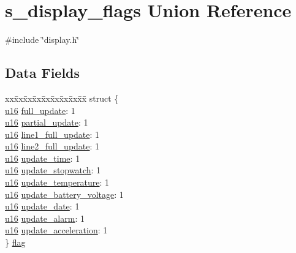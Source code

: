 \hypertarget{unions__display__flags}{\section{s\-\_\-display\-\_\-flags \-Union \-Reference}
\label{unions__display__flags}
}


{\ttfamily \#include \char`\"{}display.\-h\char`\"{}}

\subsection*{\-Data \-Fields}
\begin{DoxyCompactItemize}
\item 
\begin{tabbing}
xx\=xx\=xx\=xx\=xx\=xx\=xx\=xx\=xx\=\kill
struct \{\\
\>\hyperlink{main__ED__BM_8c_a9e6c91d77e24643b888dbd1a1a590054}{u16} \hyperlink{unions__display__flags_a71c4800011ffd6d7d66b954a94918dc0}{full\_update}: 1\\
\>\hyperlink{main__ED__BM_8c_a9e6c91d77e24643b888dbd1a1a590054}{u16} \hyperlink{unions__display__flags_a6c2c3a5d3e6b1ceeab56b3eeb805437e}{partial\_update}: 1\\
\>\hyperlink{main__ED__BM_8c_a9e6c91d77e24643b888dbd1a1a590054}{u16} \hyperlink{unions__display__flags_a2ddb9a4e7e4a70b66ff9bed6a334dc91}{line1\_full\_update}: 1\\
\>\hyperlink{main__ED__BM_8c_a9e6c91d77e24643b888dbd1a1a590054}{u16} \hyperlink{unions__display__flags_aab3b308f6c79766961f162d28a2b519f}{line2\_full\_update}: 1\\
\>\hyperlink{main__ED__BM_8c_a9e6c91d77e24643b888dbd1a1a590054}{u16} \hyperlink{unions__display__flags_a0fe35dbb92aa1da6230872d35273a99b}{update\_time}: 1\\
\>\hyperlink{main__ED__BM_8c_a9e6c91d77e24643b888dbd1a1a590054}{u16} \hyperlink{unions__display__flags_aaccf7632270071f4a6115d6934c49fa1}{update\_stopwatch}: 1\\
\>\hyperlink{main__ED__BM_8c_a9e6c91d77e24643b888dbd1a1a590054}{u16} \hyperlink{unions__display__flags_a49b58805245fc6fb2a9dd89ab9a41ef4}{update\_temperature}: 1\\
\>\hyperlink{main__ED__BM_8c_a9e6c91d77e24643b888dbd1a1a590054}{u16} \hyperlink{unions__display__flags_a1d0730fd24039050c16061de15b08b57}{update\_battery\_voltage}: 1\\
\>\hyperlink{main__ED__BM_8c_a9e6c91d77e24643b888dbd1a1a590054}{u16} \hyperlink{unions__display__flags_a42df39487f6d40b3a6a68e17289c87c6}{update\_date}: 1\\
\>\hyperlink{main__ED__BM_8c_a9e6c91d77e24643b888dbd1a1a590054}{u16} \hyperlink{unions__display__flags_ae462b6fe6c119af00acf0de08b73668f}{update\_alarm}: 1\\
\>\hyperlink{main__ED__BM_8c_a9e6c91d77e24643b888dbd1a1a590054}{u16} \hyperlink{unions__display__flags_a7e52ff6e77859978fa8af3d4b3f9b76d}{update\_acceleration}: 1\\
\} \hyperlink{unions__display__flags_aae136684576b06db2cd15737bb7f6a14}{flag}\\


\end{tabbing}
\end{DoxyCompactItemize}
